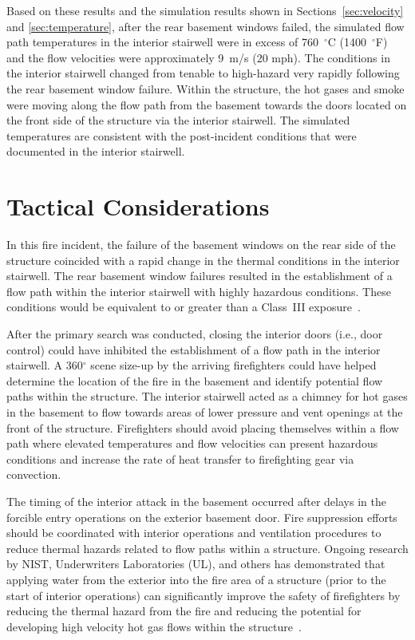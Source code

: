 \documentclass[12pt,oneside]{book}
\begin{document}
Based on these results and the simulation results shown in Sections~\ref{sec:velocity} and \ref{sec:temperature}, after the rear basement windows failed, the simulated flow path temperatures in the interior stairwell were in excess of 760~$^{\circ}$C (1400~$^{\circ}$F) and the flow velocities were approximately 9~m/s (20 mph). The conditions in the interior stairwell changed from tenable to high-hazard very rapidly following the rear basement window failure. Within the structure, the hot gases and smoke were moving  along the flow path from the basement towards the doors located on the front side of the structure via the interior stairwell. The simulated temperatures are consistent with the post-incident conditions that were documented in the interior stairwell.


\clearpage


\section{Tactical Considerations}
\label{sec:tactical_condsiderations}

In this fire incident, the failure of the basement windows on the rear side of the structure coincided with a rapid change in the thermal conditions in the interior stairwell. The rear basement window failures resulted in the establishment of a flow path within the interior stairwell with highly hazardous conditions. These conditions would be equivalent to or greater than a Class~III exposure~\cite{Donnelly2006}.

After the primary search was conducted, closing the interior doors (i.e., door control) could have inhibited the establishment of a flow path in the interior stairwell. A 360$^\circ$ scene size-up by the arriving firefighters could have helped determine the location of the fire in the basement and identify potential flow paths within the structure. The interior stairwell acted as a chimney for hot gases in the basement to flow towards areas of lower pressure and vent openings at the front of the structure. Firefighters should avoid placing themselves within a flow path where elevated temperatures and flow velocities can present hazardous conditions and increase the rate of heat transfer to firefighting gear via convection.

The timing of the interior attack in the basement occurred after delays in the forcible entry operations on the exterior basement door. Fire suppression efforts should be coordinated with interior operations and ventilation procedures to reduce thermal hazards related to flow paths within a structure. Ongoing research by NIST, Underwriters Laboratories (UL), and others has demonstrated that applying water from the exterior into the fire area of a structure (prior to the start of interior operations) can significantly improve the safety of firefighters by reducing the thermal hazard from the fire and reducing the potential for developing high velocity hot gas flows within the structure~\cite{madrzykowski2009fire, kerber2009fire}.
\end{document}

